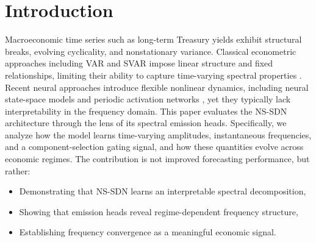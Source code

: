 \section{Introduction}
Macroeconomic time series such as long-term Treasury yields exhibit structural breaks, evolving cyclicality, and nonstationary variance. Classical econometric approaches including VAR and SVAR impose linear structure and fixed relationships, limiting their ability to capture time-varying spectral properties \cite{sims1980,lutkepohl2005,primiceritvp}.
Recent neural approaches introduce flexible nonlinear dynamics, including neural state-space models \cite{durbin2012time} and periodic activation networks \cite{sitzmann2020implicit}, yet they typically lack interpretability in the frequency domain.
This paper evaluates the NS-SDN architecture through the lens of its spectral emission heads. Specifically, we analyze how the model learns time-varying amplitudes, instantaneous frequencies, and a component-selection gating signal, and how these quantities evolve across economic regimes.
The contribution is not improved forecasting performance, but rather:
\begin{itemize}
\item Demonstrating that NS-SDN learns an interpretable spectral decomposition,
\item Showing that emission heads reveal regime-dependent frequency structure,
\item Establishing frequency convergence as a meaningful economic signal.
\end{itemize}